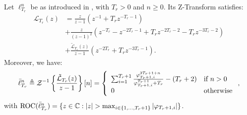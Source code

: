 \documentclass{article}
\begin{document}

    \begin{theorem} \label{thm:2-mainz}
      Let $\ell_{T_r}^{n}$ be as introduced in , with $T_r > 0$ and $n \geq 0$. 
      Its Z-Transform satisfies:
      \begin{align}
        \mathcal{L}_{T_r}(z) 
        & = \frac{z}{z-1} (z^{-1} + T_r z^{-T_r-1}) \\
        \nonumber & + \frac{z}{(z-1)^2} (z^{-T_r} - z^{-2T_r-1} + T_r z^{-2T_r-2} - T_r z^{-3T_r-2})  \\
        \nonumber & + \frac{\tilde{\mathcal{L}}_{T_r}(z)}{z-1}(z^{-2T_r} + T_r z^{-3T_r-1}).
      \end{align}
      Moreover, we have:
      \begin{equation}
        \bar{\ell}_{T_r}^{n} \triangleq  \mathcal{Z}^{-1}\left\{\frac{\tilde{\mathcal{L}}_{T_r}(z)}{z-1}\right\}[n] = 
        \left\{
          \begin{array}{ll}
            \sum_{i=1}^{T_r + 1} \frac{\varphi_{T_r + 1, i}^{3T_r + 1 + n}}
            {\varphi_{T_r + 1, i}^{T_r + 1} + T_r} - (T_r+2) & \mbox{if } n > 0 \\
            0 & \mbox{otherwise}
          \end{array}
        \right.,
      \end{equation}
      with $\textnormal{ROC}(\bar{\ell}_{T_r}^n) = \{z \in \mathbb C: |z| > \max_{i \in \{1, \dots, T_r + 1\}} |\varphi_{T_r + 1, i}|\}$.
    \end{theorem}
\end{document}
